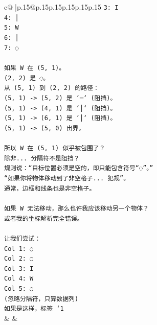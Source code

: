 \documentclass{article}
\begin{document}
{\begin{supertabular}{c@{$\;$}|p{.15\linewidth}@{}p{.15\linewidth}p{.15\linewidth}p{.15\linewidth}p{.15\linewidth}p{.15\linewidth}}
{{{\texttt{3: I} \\
\texttt{4: │} \\
\texttt{5: W} \\
\texttt{6: │} \\
\texttt{7: ◌} \\
\\ 
\texttt{如果 W 在 (5, 1)。} \\
\texttt{(2, 2) 是 ◌。} \\
\texttt{从 (5, 1) 到 (2, 2) 的路径：} \\
\texttt{(5, 1) {-}> (5, 2) 是 `─` (阻挡)。} \\
\texttt{(5, 1) {-}> (4, 1) 是 `│` (阻挡)。} \\
\texttt{(5, 1) {-}> (6, 1) 是 `│` (阻挡)。} \\
\texttt{(5, 1) {-}> (5, 0) 出界。} \\
\\ 
\texttt{所以 W 在 (5, 1) 似乎被包围了？} \\
\texttt{除非... 分隔符不是阻挡？} \\
\texttt{规则说：“目标位置必须是空的，即只能包含符号“◌”。”} \\
\texttt{“如果你将物体移动到了非空格子... 犯规”。} \\
\texttt{通常，边框和线条也是非空格子。} \\
\\ 
\texttt{如果 W 无法移动，那么也许我应该移动另一个物体？} \\
\texttt{或者我的坐标解析完全错误。} \\
\\ 
\texttt{让我们尝试：} \\
\texttt{Col 1: ◌} \\
\texttt{Col 2: ◌} \\
\texttt{Col 3: I} \\
\texttt{Col 4: W} \\
\texttt{Col 5: ◌} \\
\texttt{(忽略分隔符，只算数据列)} \\
\texttt{如果是这样，标签 `1} \\
            }
        }
    }
    & & \\ \\


\end{supertabular}}
\end{document}
